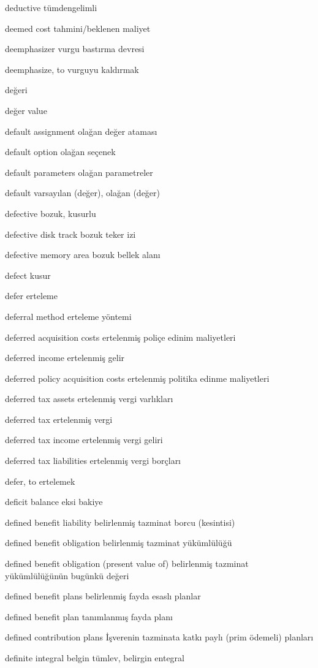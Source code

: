 \documentclass[12pt,fleqn]{article}\usepackage{../../common}
\begin{document}
deductive tümdengelimli

deemed cost tahmini/beklenen maliyet

deemphasizer vurgu bastırma devresi

deemphasize, to vurguyu kaldırmak

değeri

değer value

default assignment olağan değer ataması

default option olağan seçenek

default parameters olağan parametreler

default varsayılan (değer), olağan (değer)

defective bozuk, kusurlu

defective disk track bozuk teker izi

defective memory area bozuk bellek alanı

defect kusur

defer erteleme

deferral method erteleme yöntemi

deferred acquisition costs ertelenmiş poliçe edinim maliyetleri

deferred income ertelenmiş gelir

deferred policy acquisition costs ertelenmiş politika edinme maliyetleri

deferred tax assets ertelenmiş vergi varlıkları

deferred tax ertelenmiş vergi

deferred tax income ertelenmiş vergi geliri

deferred tax liabilities ertelenmiş vergi borçları

defer, to ertelemek

deficit balance eksi bakiye

defined benefit liability belirlenmiş tazminat borcu (kesintisi)

defined benefit obligation belirlenmiş tazminat yükümlülüğü

defined benefit obligation (present value of) belirlenmiş tazminat yükümlülüğünün bugünkü değeri

defined benefit plans belirlenmiş fayda esaslı planlar

defined benefit plan tanımlanmış fayda planı

defined contribution plans İşverenin tazminata katkı paylı (prim ödemeli) planları

definite integral belgin tümlev, belirgin entegral
\end{document}

